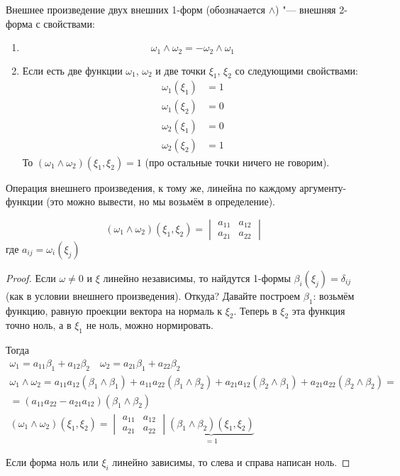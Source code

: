 \begin{Def}
	Внешнее произведение двух внешних 1-форм (обозначается $\wedge$) "--- внешняя 2-форма с свойствами:
	\begin{enumerate}
	\item
		\[ \omega_1 \wedge \omega_2 = - \omega_2 \wedge \omega_1 \]
	
	\item
		Если есть две функции $\omega_1$, $\omega_2$ и две точки $\xi_1$, $\xi_2$ со следующими свойствами:
		\begin{align*}
			\omega_1(\xi_1) &= 1 \\
			\omega_1(\xi_2) &= 0 \\
			\omega_2(\xi_1) &= 0 \\
			\omega_2(\xi_2) &= 1
		\end{align*}
		То $(\omega_1 \wedge \omega_2)(\xi_1, \xi_2) = 1$ (про остальные точки ничего не говорим).
	\end{enumerate}
	Операция внешнего произведения, к тому же, линейна по каждому аргументу-функции (это можно вывести, но мы возьмём в определение).
\end{Def}

\begin{theorem}
	\[ (\omega_1 \wedge \omega_2)(\xi_1, \xi_2) = \begin{vmatrix} a_{11} & a_{12} \\ a_{21} & a_{22} \end{vmatrix} \]
	где $a_{ij} = \omega_i(\xi_j)$
\end{theorem}
\begin{proof}
	Если $\omega \ne 0$ и $\xi$ линейно независимы, то найдутся 1-формы $\beta_i(\xi_j) = \delta_{ij}$ (как в условии внешнего произведения).
	Откуда?
	Давайте построем $\beta_1$: возьмём функцию, равную проекции вектора на нормаль к $\xi_2$.
	Теперь в $\xi_2$ эта функция точно ноль, а в $\xi_1$ не ноль, можно нормировать.

	Тогда
	\begin{gather*}
		\omega_1 = a_{11} \beta_1 + a_{12} \beta_2 \quad \omega_2 = a_{21} \beta_1 + a_{22} \beta_2 \\
		\omega_1 \wedge \omega_2
		= a_{11} a_{12} (\beta_1 \wedge \beta_1)
		+ a_{11} a_{22} (\beta_1 \wedge \beta_2)
		+ a_{21} a_{12} (\beta_2 \wedge \beta_1)
		+ a_{21} a_{22} (\beta_2 \wedge \beta_2) = \\
		= (a_{11} a_{22} - a_{21} a_{12}) (\beta_1 \wedge \beta_2) \\
		(\omega_1 \wedge \omega_2) (\xi_1, \xi_2)
		= \begin{vmatrix} a_{11} & a_{12} \\ a_{21} & a_{22} \end{vmatrix} \underbrace{(\beta_1 \wedge \beta_2) (\xi_1, \xi_2)}_{=1}
	\end{gather*}

	Если форма ноль или $\xi_i$ линейно зависимы, то слева и справа написан ноль.
\end{proof}

